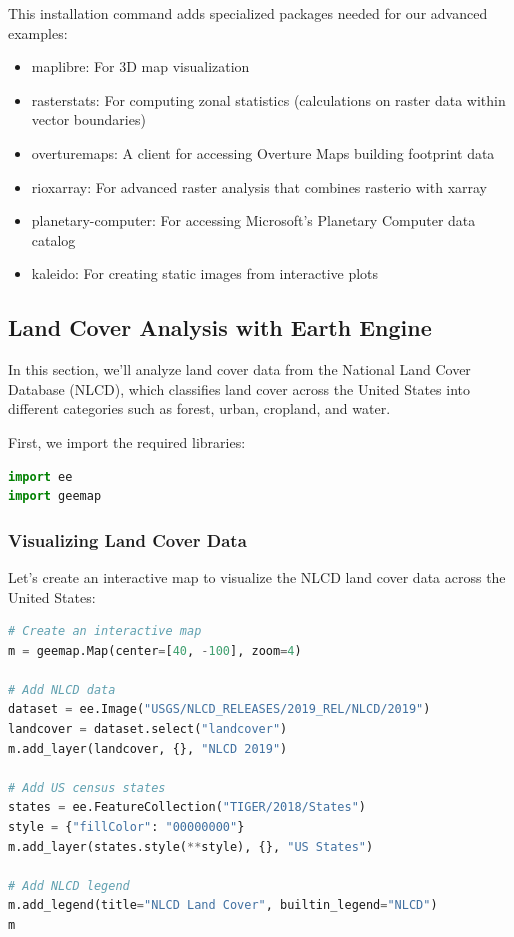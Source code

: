This installation command adds specialized packages needed for our advanced examples:

\begin{itemize}
\item maplibre: For 3D map visualization
\item rasterstats: For computing zonal statistics (calculations on raster data within vector boundaries)
\item overturemaps: A client for accessing Overture Maps building footprint data
\item rioxarray: For advanced raster analysis that combines rasterio with xarray
\item planetary-computer: For accessing Microsoft's Planetary Computer data catalog
\item kaleido: For creating static images from interactive plots
\end{itemize}

\subsection{Land Cover Analysis with Earth Engine}

In this section, we'll analyze land cover data from the National Land Cover Database (NLCD), which classifies land cover across the United States into different categories such as forest, urban, cropland, and water.

First, we import the required libraries:

\begin{lstlisting}[language=Python]
import ee
import geemap
\end{lstlisting}

\subsubsection{Visualizing Land Cover Data}

Let's create an interactive map to visualize the NLCD land cover data across the United States:

\begin{lstlisting}[language=Python]
# Create an interactive map
m = geemap.Map(center=[40, -100], zoom=4)

# Add NLCD data
dataset = ee.Image("USGS/NLCD_RELEASES/2019_REL/NLCD/2019")
landcover = dataset.select("landcover")
m.add_layer(landcover, {}, "NLCD 2019")

# Add US census states
states = ee.FeatureCollection("TIGER/2018/States")
style = {"fillColor": "00000000"}
m.add_layer(states.style(**style), {}, "US States")

# Add NLCD legend
m.add_legend(title="NLCD Land Cover", builtin_legend="NLCD")
m
\end{lstlisting}

